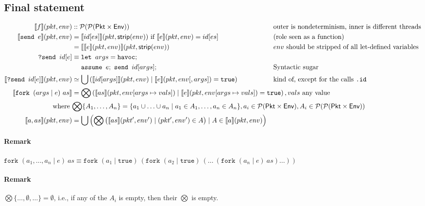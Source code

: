 \documentclass{report}
\newcommand\sem[1]{\llbracket #1\rrbracket}
\newcommand{\pkt}{\ensuremath{pkt}}
\newcommand{\env}{\ensuremath{env}}
\newcommand{\true}{\texttt{true}}
\begin{document}
\subsection{Final statement}
\begin{align*} 
\sem{f}(\pkt,\env) & :: \mathcal{P}(\mathcal{P}({\sf Pkt}\times{\sf Env})) &
&\text{outer is nondeterminism, inner is different threads}
\\
\sem{\texttt{send }e}(\pkt,\env) & =\sem{id[es]}(\pkt,\textsf{strip}(\env))
\text{ if }\sem{e}(\pkt,\env)=id[es] &
& \text{(role seen as a function)}
\\& = \sem{\sem{e}(\pkt,\env)}(\pkt,\textsf{strip}(\env))
&& \text{$env$ should be stripped of all \textrm{let}-defined variables}
\\
\texttt{?send }id[e] & \equiv
\texttt{let }args=\texttt{havoc};\\
&\quad\ \texttt{assume }e;\ \texttt{send }id[args];&
& \text{Syntactic sugar}
\\
\sem{\texttt{?send }id[e]}(\pkt,\env) & \simeq\bigcup\left(\sem{id[args]}(\pkt,\env)\mid\sem{e}(\pkt,\env[,args])=\true\right) &
& \text{kind of, except for the calls \texttt{.id}}
\\
\sem{\texttt{fork } (args\mid e)\ as} & =\rlap{$\displaystyle\bigotimes\left(\sem{as}(\pkt,\env[args\mapsto vals])\mid\sem{e}(\pkt,\env[args\mapsto vals])=\texttt{true}\right), vals\text{ any value}$}
\\
\text{where } & \rlap{$\displaystyle\bigotimes\{A_1,\ldots,A_n\}=\{a_1\cup\ldots\cup a_n\mid a_1\in A_1,\ldots,a_n\in A_n\}, a_i\in\mathcal P({\sf Pkt}\times{\sf Env}), A_i\in\mathcal P(\mathcal P({\sf Pkt}\times{\sf Env}))$}
\\
\sem{a,as}(\pkt,\env) & = \bigcup\left(\bigotimes\big(\sem{as}(\pkt',\env') \mid (\pkt',\env')\in A\big)
\mid A\in\sem{a}(\pkt,\env)\right)
\end{align*}

\paragraph{Remark} 
$\texttt{fork }(a_1,\ldots,a_n\mid e)\ as\equiv
\texttt{fork }(a_1\mid\true)\ (\texttt{fork } (a_2\mid\true)\ (\ldots\ (\texttt{fork }(a_n\mid e)\ as)\ldots))$

\paragraph{Remark} $\displaystyle\bigotimes\{\ldots,\emptyset,\ldots\}=\emptyset$, i.e.,
if any of the $A_i$ is empty, then their $\displaystyle\bigotimes$ is empty.
\end{document}
